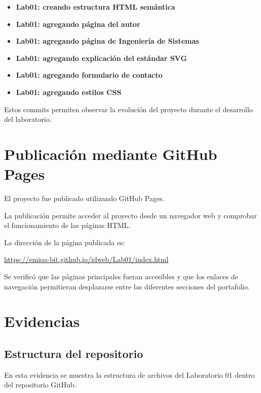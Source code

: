 \documentclass{article}
\begin{document}
\begin{itemize}

    \item \textbf{Lab01: creando estructura HTML semántica}

    \item \textbf{Lab01: agregando página del autor}

    \item \textbf{Lab01: agregando página de Ingeniería de Sistemas}

    \item \textbf{Lab01: agregando explicación del estándar SVG}

    \item \textbf{Lab01: agregando formulario de contacto}

    \item \textbf{Lab01: agregando estilos CSS}

\end{itemize}

Estos commits permiten observar la evolución del proyecto
durante el desarrollo del laboratorio.

\section{Publicación mediante GitHub Pages}

El proyecto fue publicado utilizando GitHub Pages.

La publicación permite acceder al proyecto desde un navegador
web y comprobar el funcionamiento de las páginas HTML.

La dirección de la página publicada es:

\url{https://emioa-bit.github.io/idweb/Lab01/index.html}

Se verificó que las páginas principales fueran accesibles
y que los enlaces de navegación permitieran desplazarse
entre las diferentes secciones del portafolio.


\section{Evidencias}


\subsection{Estructura del repositorio}

En esta evidencia se muestra la estructura de archivos del
Laboratorio 01 dentro del repositorio GitHub.
\end{document}
